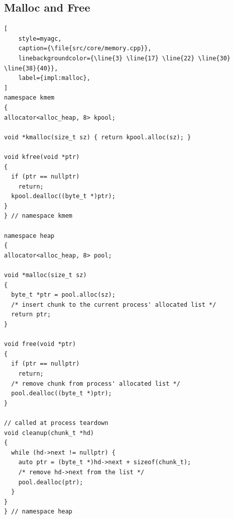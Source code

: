 \subsection{Malloc and Free}

\begin{lstlisting}[
    style=myagc, 
    caption={\file{src/core/memory.cpp}},
    linebackgroundcolor={\line{3} \line{17} \line{22} \line{30} \line{38}{40}},
    label={impl:malloc},
]
namespace kmem
{
allocator<alloc_heap, 8> kpool;

void *kmalloc(size_t sz) { return kpool.alloc(sz); }

void kfree(void *ptr) 
{
  if (ptr == nullptr) 
    return;
  kpool.dealloc((byte_t *)ptr);
}
} // namespace kmem

namespace heap
{
allocator<alloc_heap, 8> pool;

void *malloc(size_t sz)
{
  byte_t *ptr = pool.alloc(sz);
  /* insert chunk to the current process' allocated list */
  return ptr;
}

void free(void *ptr)
{
  if (ptr == nullptr)
    return;
  /* remove chunk from process' allocated list */
  pool.dealloc((byte_t *)ptr);
}

// called at process teardown
void cleanup(chunk_t *hd)
{
  while (hd->next != nullptr) {
    auto ptr = (byte_t *)hd->next + sizeof(chunk_t);
    /* remove hd->next from the list */
    pool.dealloc(ptr);
  }
}
} // namespace heap
\end{lstlisting}
